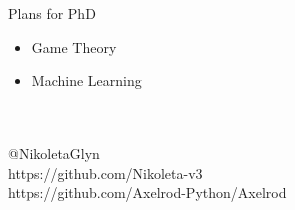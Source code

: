 \documentclass{beamer}
\begin{document}
\begin{frame}{Plans for PhD}
    \begin{itemize}[label={--}]
        \item Game Theory
        \item Machine Learning
    \end{itemize}
\end{frame}

\begin{frame}
	\begin{center}
		\huge{\textbf{}}\\~\\
		\small{@NikoletaGlyn}\\
		\small{https://github.com/Nikoleta-v3}\\
		\small{https://github.com/Axelrod-Python/Axelrod}
	\end{center}
\end{frame}
\end{document}

